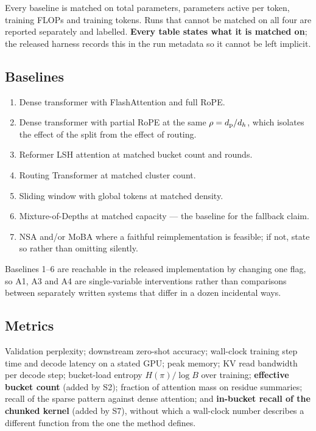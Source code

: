 Every baseline is matched on total parameters, parameters active per token, training FLOPs and training tokens. Runs that cannot be matched on all four are reported separately and labelled. \textbf{Every table states what it is matched on}; the released harness records this in the run metadata so it cannot be left implicit.

\subsection{Baselines}

\begin{enumerate}
\item Dense transformer with FlashAttention \citep{dao2022flashattention} and full RoPE.
\item Dense transformer with partial RoPE at the same $\rho = d_{\mathrm{p}}/d_h$, which isolates the effect of the split from the effect of routing.
\item Reformer LSH attention \citep{kitaev2020reformer} at matched bucket count and rounds.
\item Routing Transformer \citep{roy2021routing} at matched cluster count.
\item Sliding window with global tokens \citep{beltagy2020longformer} at matched density.
\item Mixture-of-Depths \citep{raposo2024mixture} at matched capacity --- the baseline for the fallback claim.
\item NSA \citep{yuan2025nsa} and/or MoBA \citep{lu2025moba} where a faithful reimplementation is feasible; if not, state so rather than omitting silently.
\end{enumerate}

Baselines 1--6 are reachable in the released implementation by changing one flag, so A1, A3 and A4 are single-variable interventions rather than comparisons between separately written systems that differ in a dozen incidental ways.

\subsection{Metrics}

Validation perplexity; downstream zero-shot accuracy; wall-clock training step time and decode latency on a stated GPU; peak memory; KV read bandwidth per decode step; bucket-load entropy $H(\pi)/\log B$ over training; \textbf{effective bucket count} (added by S2); fraction of attention mass on residue summaries; recall of the sparse pattern against dense attention; and \textbf{in-bucket recall of the chunked kernel} (added by S7), without which a wall-clock number describes a different function from the one the method defines.

